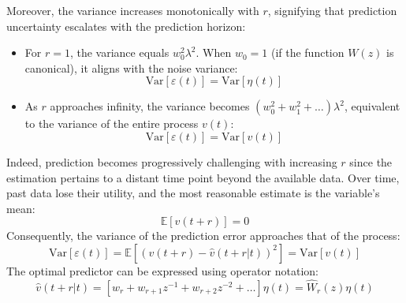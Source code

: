 Moreover, the variance increases monotonically with $r$, signifying that prediction uncertainty escalates with the prediction horizon:
\begin{itemize}
    \item For $r=1$, the variance equals $w_0^2\lambda^2$. 
        When $w_0=1$ (if the function $W(z)$ is canonical), it aligns with the noise variance:
        \[\text{Var}\left[\varepsilon(t) \right]=\text{Var}\left[\eta(t) \right]\]
    \item As $r$ approaches infinity, the variance becomes $(w_0^2 + w_1^2 + \dots)\lambda^2$, equivalent to the variance of the entire process $v(t)$:
        \[\text{Var}\left[\varepsilon(t) \right]=\text{Var}\left[v(t) \right]\]
\end{itemize}
Indeed, prediction becomes progressively challenging with increasing $r$ since the estimation pertains to a distant time point beyond the available data. 
Over time, past data lose their utility, and the most reasonable estimate is the variable's mean: 
\[\mathbb{E}\left[v(t+r)\right]=0\]
Consequently, the variance of the prediction error approaches that of the process:
\[\text{Var}\left[\varepsilon(t)\right]=\mathbb{E}\left[\left(v(t+r)-\hat{v}(t+r|t)\right)^2\right]=\text{Var}\left[v(t)\right]\]
The optimal predictor can be expressed using operator notation:
\[\hat{v}(t+r|t)=\left[w_r+w_{r+1}z^{-1}+w_{r+2}z^{-2}+\dots \right]\eta(t)=\hat{W}_r(z)\eta(t)\]
